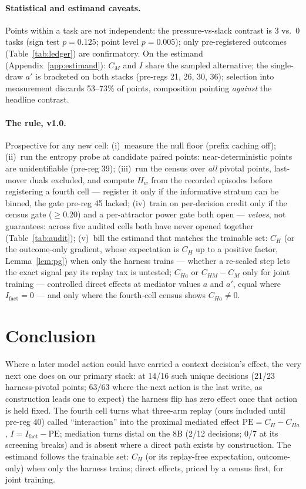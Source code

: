 \documentclass{article}
\theoremstyle{remark}
\begin{document}
\paragraph{Statistical and estimand caveats.} Points within a task are
not independent: the pressure-vs-slack contrast is 3 vs.\ 0 tasks (sign
test $p=0.125$; point level $p=0.005$); only pre-registered outcomes
(Table~\ref{tab:ledger}) are confirmatory. On the estimand
(Appendix~\ref{app:estimand}): $C_M$ and $I$ share the sampled
alternative; the single-draw $a'$ is bracketed on both stacks (pre-regs
21, 26, 30, 36); selection into measurement discards 53--73\% of points,
composition pointing \emph{against} the headline contrast.

\paragraph{The rule, v1.0.} Prospective for any new cell:
(i)~measure the null floor (prefix caching off); (ii)~run the entropy
probe at candidate paired points: near-deterministic points are
unidentifiable (pre-reg 39); (iii)~run the census over \emph{all}
pivotal points, last-mover duals excluded, and compute $H_w$ from the
recorded episodes before registering a fourth cell --- register it only
if the informative stratum can be binned, the gate pre-reg 45 lacked;
(iv)~train on per-decision
credit only if the census gate ($\geq 0.20$) and a per-attractor power
gate both open --- \emph{vetoes}, not guarantees: across five audited
cells both have never opened together (Table~\ref{tab:audit});
(v)~bill the estimand that
matches the trainable set: $C_H$ (or the outcome-only gradient, whose
expectation is $C_H$ up to a positive factor, Lemma~\ref{lem:pg}) when
only the harness trains ---
whether a re-scaled step lets the exact signal pay its replay tax is
untested; $C_{Ha}$ or $C_{HM}-C_M$ only for joint
training --- controlled direct effects at mediator values $a$ and $a'$,
equal where $I_{\text{fact}} = 0$ --- and only where the fourth-cell
census shows $C_{Ha} \neq 0$.

\section{Conclusion}
Where a later model action could have carried a context decision's
effect, the very next one does on our primary stack: at 14/16 such
unique decisions (21/23 harness-pivotal points; 63/63 where the next
action is the last write, as construction leads one to expect) the
harness flip has zero
effect once that action is held fixed. The fourth cell turns what
three-arm replay (ours included until pre-reg 40) called
``interaction'' into the proximal mediated effect $\mathrm{PE} = C_H -
C_{Ha}$, $I = I_{\text{fact}} - \mathrm{PE}$; mediation turns distal on
the 8B (2/12 decisions; 0/7 at its screening breaks) and is absent where a direct path
exists by construction. The estimand follows the trainable set: $C_H$
(or its replay-free expectation, outcome-only) when only the harness
trains; direct effects, priced by a census first, for joint training.
\end{document}
